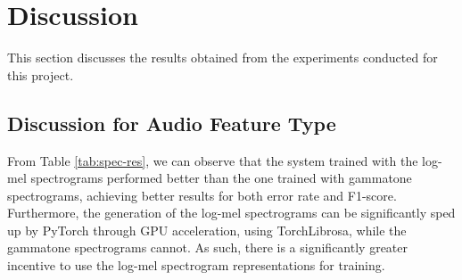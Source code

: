 \begin{table}[!htb]
\centering
{}
\caption{\label{tab:long-res}Comparison of processing methods for longer audio clips}
\end{table}

\section{Discussion}
This section discusses the results obtained from the experiments conducted for this project.

\subsection{Discussion for Audio Feature Type}
From Table \ref{tab:spec-res}, we can observe that the system trained with the log-mel spectrograms performed better than the one trained with gammatone spectrograms, achieving better results for both error rate and F1-score. Furthermore, the generation of the log-mel spectrograms can be significantly sped up by PyTorch through GPU acceleration, using TorchLibrosa, while the gammatone spectrograms cannot. As such, there is a significantly greater incentive to use the log-mel spectrogram representations for training. 

